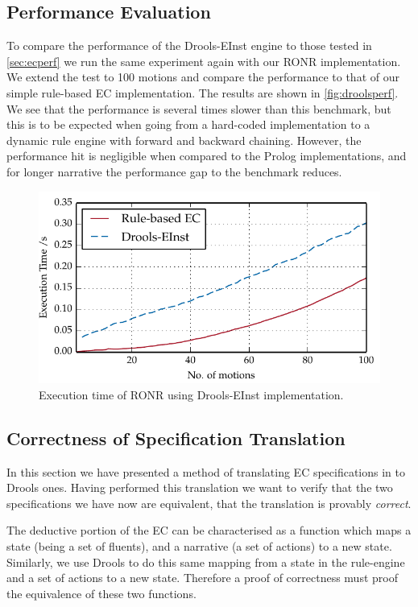\subsection{Performance Evaluation}

To compare the performance of the Drools-EInst engine to those tested in
\autoref{sec:ecperf} we run the same experiment again with our \ac{RONR}
implementation. We extend the test to 100 motions and compare the performance
to that of our simple rule-based \ac{EC} implementation. The results are shown
in \autoref{fig:droolsperf}. We see that the performance is several times
slower than this benchmark, but this is to be expected when going from a hard-coded
implementation to a dynamic rule engine with forward and backward
chaining. However, the performance hit is negligible when compared to the
Prolog implementations, and for longer narrative the performance gap to the
benchmark reduces.

\begin{figure}
\centering
\includegraphics{gfx/ec/droolsvsrules}
\caption{Execution time of RONR using Drools-EInst implementation.}\label{fig:droolsperf}
\end{figure}

\subsection{Correctness of Specification Translation}

In this section we have presented a method of translating \ac{EC}
specifications in to Drools ones. Having performed this translation we want to
verify that the two specifications we have now are equivalent, that the
translation is provably \emph{correct}.

The deductive portion of the \ac{EC} can be characterised as a function which
maps a state (being a set of fluents), and a narrative (a set of actions) to a
new state. Similarly, we use Drools to do this same mapping from a state in
the rule-engine and a set of actions to a new state. Therefore a proof of
correctness must proof the equivalence of these two functions.

